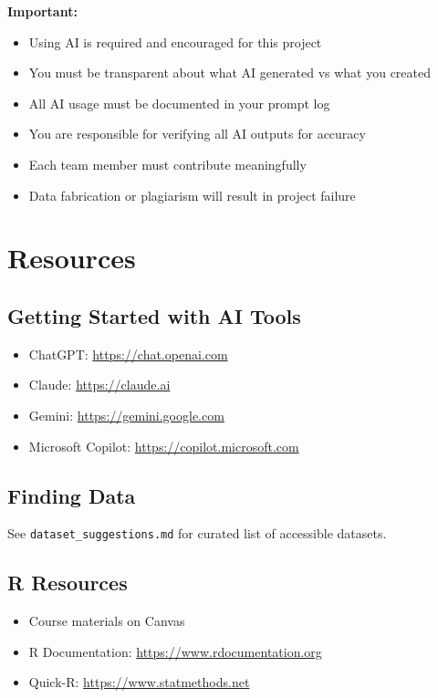 \documentclass[11pt]{article}
\begin{document}
\begin{tcolorbox}[colback=red!5,colframe=red,boxrule=1pt,arc=2pt,left=6pt,right=6pt,top=6pt,bottom=6pt]
\textbf{Important:}
\begin{itemize}
\item Using AI is required and encouraged for this project
\item You must be transparent about what AI generated vs what you created
\item All AI usage must be documented in your prompt log
\item You are responsible for verifying all AI outputs for accuracy
\item Each team member must contribute meaningfully
\item Data fabrication or plagiarism will result in project failure
\end{itemize}
\end{tcolorbox}

\section{Resources}

\subsection{Getting Started with AI Tools}
\begin{itemize}
\item ChatGPT: \url{https://chat.openai.com}
\item Claude: \url{https://claude.ai}
\item Gemini: \url{https://gemini.google.com}
\item Microsoft Copilot: \url{https://copilot.microsoft.com}
\end{itemize}

\subsection{Finding Data}
See \texttt{dataset\_suggestions.md} for curated list of accessible datasets.

\subsection{R Resources}
\begin{itemize}
\item Course materials on Canvas
\item R Documentation: \url{https://www.rdocumentation.org}
\item Quick-R: \url{https://www.statmethods.net}
\end{itemize}
\end{document}
